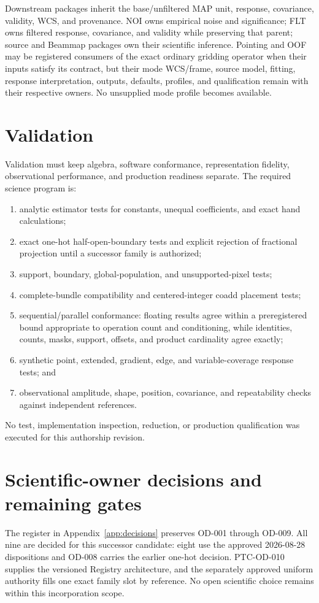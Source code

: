\documentclass[10pt]{article}
\begin{document}
Downstream packages inherit the base/unfiltered MAP unit, response, covariance,
validity, WCS, and provenance. NOI owns empirical noise and significance; FLT
owns filtered response, covariance, and validity while preserving that parent;
source and Beammap packages own their scientific inference. Pointing and OOF
may be registered consumers of the exact ordinary gridding operator when their
inputs satisfy its contract, but their mode WCS/frame, source model, fitting,
response interpretation, outputs, defaults, profiles, and qualification remain
with their respective owners. No unsupplied mode profile becomes available.

\clearpage
\section{Validation}\label{sec:validation}
Validation must keep algebra, software conformance, representation fidelity,
observational performance, and production readiness separate. The required
science program is:
\begin{enumerate}[label=\textbf{\arabic*.},leftmargin=*]
\item analytic estimator tests for constants, unequal coefficients, and exact
hand calculations;
\item exact one-hot half-open-boundary tests and explicit rejection of
fractional projection until a successor family is authorized;
\item support, boundary, global-population, and unsupported-pixel tests;
\item complete-bundle compatibility and centered-integer coadd placement
tests;
\item sequential/parallel conformance: floating results agree within a
preregistered bound appropriate to operation count and conditioning, while
identities, counts, masks, support, offsets, and product cardinality agree
exactly;
\item synthetic point, extended, gradient, edge, and variable-coverage
response tests; and
\item observational amplitude, shape, position, covariance, and repeatability
checks against independent references.
\end{enumerate}
No test, implementation inspection, reduction, or production qualification
was executed for this authorship revision.

\section{Scientific-owner decisions and remaining gates}\label{sec:decisions}
The register in Appendix~\ref{app:decisions} preserves OD-001 through OD-009.
All nine are decided for this successor candidate: eight use the approved
2026-08-28 dispositions and OD-008 carries the earlier one-hot decision.
PTC-OD-010 supplies the versioned Registry architecture, and the separately
approved uniform authority fills one exact family slot by reference. No open
scientific choice remains within this incorporation scope.
\end{document}
